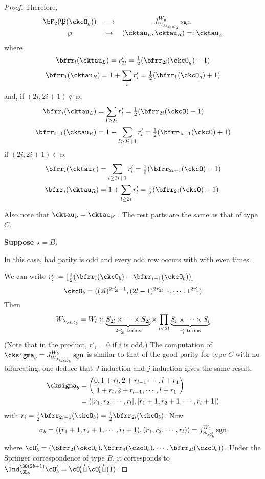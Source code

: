\documentclass[12pt,a4paper]{amsart}
\newcommand{\sgn}{\operatorname{sgn}}
\numberwithin{equation}{section}
\theoremstyle{remark}
\def\half{{\tfrac{1}{2}}}
\def\floor#1{{\lfloor #1 \rfloor}}
\def\lamckb{\lambda_{\ckcO_b}}
\def\lamckg{\lambda_{\ckcO_g}}
\def\cuprow{{\stackrel{r}{\sqcup}}}
\def\CPP{\mathfrak{P}}
\def\sP{\wp}
\begin{document}
\begin{proof}
{  Therefore,
  \[
    \begin{array}{ccc}
      \bF_{2}(\CPP(\ckcO_{g}))&\longrightarrow
      & J_{W_{\lamckg}}^{W_{g}} \sgn \\
      \sP&\mapsto&    (\cktau_{L},\cktau_{R}) =:\cktau_{\sP}
    \end{array}
  \]
  where
  \[
  \bfrr_{l}(\cktau_{L})  =
      r'_{2l} =
      \half (\bfrr_{2l}(\ckcO_{g})-1)
  \]
  \[
  \bfrr_{1}(\cktau_{R})  =
      1+ \sum_{i} r'_{i} =
      \half (\bfrr_{1}(\ckcO_{g})+1)
  \]
  and, if $(2i,2i+1)\notin \sP$,
  \[
    \begin{split}
      \bfrr_{i}(\cktau_{L}) & = \sum_{l\geq 2i} r'_{l}
      = \half(\bfrr_{2i}(\ckcO)-1)\\
      \bfrr_{i+1}(\cktau_{R}) & = 1 + \sum_{l\geq 2i+1} r'_{l}
      = \half(\bfrr_{2i+1}(\ckcO)+1)
    \end{split}
  \]
  if $(2i,2i+1)\in \sP$,
  \[
    \begin{split}
      \bfrr_{i}(\cktau_{L}) & = \sum_{l\geq 2i+1} r'_{l}
      = \half(\bfrr_{2i+1}(\ckcO)-1)\\
      \bfrr_{i}(\cktau_{R}) & = 1 + \sum_{l\geq 2i} r'_{l}
      = \half(\bfrr_{2i}(\ckcO)+1)
    \end{split}
  \]

  Also note that $\cktau_{\sP}=\cktau_{\sP^{c}}$.
  The rest parts are the same as that of type $C$.

  {\bf Suppose $\star=B$. }

  In this case, bad parity is odd and every odd row occurs with with even times.

  We can write $r'_{i} := \floor{\half(\bfrr_{i}(\ckcO_{b})-\bfrr_{i-1}(\ckcO_{b}))}$
  \[
    \ckcO_{b} %
    = ((2l)^{2r'_{2l}+1}, (2l-1)^{2r'_{2l-1}},\cdots, 1^{2r'_{1}})
  \]
  Then
  \[
    W_{\lamckb} = W_{l} \times
    \underbrace{S_{2l}\times \cdots \times S_{2l}}_{2r'_{2l}\text{-terms}}
    \times \prod_{i<2l}
    \underbrace{S_{i}\times \cdots\times S_{i}}_{r'_{i}\text{-terms}}
  \]
  (Note that in the product, $r'_{i}=0$ if $i$ is odd.)
  The computation of
  $\cksigma_{b} = J_{W_{\lamckb}}^{W_{b}} \sgn$ is similar to that of the good
  parity for type $C$ with no bifurcating, one deduce that $J$-induction and
  $j$-induction gives the same result.
  \[
    \begin{split}
    \cksigma_{b} &=
       \binom{0, 1+r_{l}, 2+r_{l-1}\cdots, l+r_{1}}{1+r_{l},2+r_{l-1}, \cdots, l+r_{1}}\\
       & = ([r_{1},r_{2},\cdots, r_{l}],[r_{1}+1,r_{2}+1,\cdots,r_{l}+1])\\
     \end{split}
   \]
  with $r_{i} = \half\bfrr_{2i-1}(\ckcO_{b}) =  \half\bfrr_{2i}(\ckcO_{b})$.
  Now
  \[
    \sigma_{b} =
    ((r_{1}+1,r_{2}+1,\cdots,r_{l}+1),
    (r_{1},r_{2},\cdots, r_{l}))
    = j_{S_{\cO'_{b}}}^{W_{b}}\sgn
  \]
  where $\cO'_{b}=(\bfrr_{2}(\ckcO_{b}),\bfrr_{4}(\ckcO_{b}),\cdots,
 \bfrr_{2l}(\ckcO_{b}))$.
 Under the Springer correspondence of type $B$, it corresponds to
 $\Ind_{\GL_{b}}^{\SO(2b+1)}\cO'_{b} = \cO'_{b}\cuprow \cO'_{b}\cuprow (1)$.

}
\end{proof}
\end{document}
